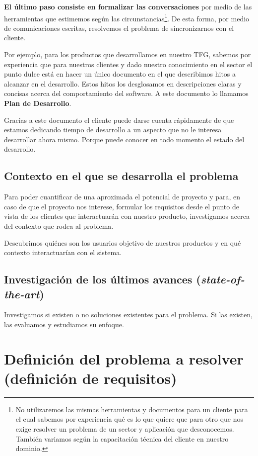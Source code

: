 \textbf{El último paso consiste en formalizar las conversaciones} por medio de las
herramientas que estimemos según las circunstancias\footnote{%
    No utilizaremos las mismas herramientas y documentos para un cliente para el cual
    sabemos por experiencia qué es lo que quiere que para otro que nos exige resolver
    un problema de un sector y aplicación que desconocemos. También variamos según
    la capacitación técnica del cliente en nuestro dominio.
}. De esta forma, por medio de comunicaciones escritas, resolvemos el problema de
sincronizarnos con el cliente.

Por ejemplo, para los productos que desarrollamos en nuestro TFG, sabemos por experiencia
que para nuestros clientes y dado nuestro conocimiento en el sector el punto dulce está
en hacer un único documento en el que describimos hitos a alcanzar en el desarrollo.
Estos hitos los desglosamos en descripciones claras y concisas acerca del comportamiento del software.
A este documento lo llamamos \textbf{Plan de Desarrollo}.

Gracias a este documento el cliente puede darse
cuenta rápidamente de que estamos dedicando tiempo de desarrollo a un aspecto que no le
interesa desarrollar ahora mismo. Porque puede conocer en todo momento el estado del desarrollo.

\subsection{Contexto en el que se desarrolla el problema}

Para poder cuantificar de una aproximada el potencial de proyecto y para, en caso de que el
proyecto nos interese, formular los requisitos desde el punto de vista de los clientes que
interactuarán con nuestro producto, investigamos acerca del contexto que rodea al problema.

Descubrimos quiénes son los usuarios objetivo de nuestros productos y en qué contexto
interactuarían con el sistema.

\subsection{Investigación de los últimos avances (\textit{state-of-the-art})}

Investigamos si existen o no soluciones existentes para el problema. Si las existen,
las evaluamos y estudiamos su enfoque.

\section{Definición del problema a resolver (definición de requisitos)}

